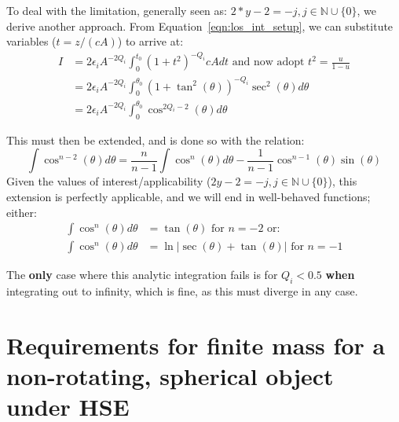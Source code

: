 \documentclass[twocolumn,traditabstract]{aa}
\begin{document}
To deal with the limitation, generally seen as: $2*y-2 = -j, j \in \mathbb{N} \cup \{0\}$, we derive another approach.
From Equation~\ref{eqn:los_int_setup}, we can substitute variables ($t = z / (cA)$) to arrive at:
\begin{align}
  I &= 2 \epsilon_i A^{-2Q_i} \int_{0}^{t_0}(1+t^2)^{-Q_i} c A dt \text{ and now adopt } t^2 = \frac{u}{1-u} \\
    &= 2 \epsilon_i A^{-2Q_i} \int_{0}^{\theta_0}(1+\tan^2(\theta))^{-Q_i} \sec^2(\theta) d\theta \\
    &= 2 \epsilon_i A^{-2Q_i} \int_{0}^{\theta_0}\cos^{2Q_i-2}(\theta) d\theta
\end{align}

This must then be extended, and is done so with the relation:
\begin{equation}
  \int \cos^{n-2}(\theta) d\theta = \frac{n}{n-1}\int \cos^n(\theta)d\theta - \frac{1}{n-1}\cos^{n-1}(\theta)\sin(\theta) 
  \label{eqn:cosext}
\end{equation}
Given the values of interest/applicability ($2y-2 = -j, j \in \mathbb{N} \cup \{0\}$), this extension is perfectly
applicable, and we will end in well-behaved functions; either:
\begin{align*}
  \int \cos^n(\theta)d\theta &= \tan(\theta) \text{ for } n=-2 \text{ or: } \\
  \int \cos^n(\theta)d\theta &= \ln \vert \sec(\theta) + \tan(\theta) \vert \text{ for } n=-1
\end{align*}

The \textbf{only} case where this analytic integration fails is for $Q_i < 0.5$ \textbf{when} integrating out to infinity,
which is fine, as this must diverge in any case. 

\section{Requirements for finite mass for a non-rotating, spherical object under HSE}
\label{sec:finite_mass}
\end{document}
